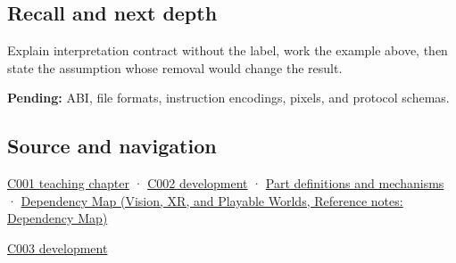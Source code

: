 \subsection{Recall and next depth}\label{appendix-f414bd4ed05c-recall-and-next-depth}

Explain interpretation contract without the label, work the example above, then state the assumption whose removal would change the result.

\textbf{Pending:} ABI, file formats, instruction encodings, pixels, and protocol schemas.

\subsection{Source and navigation}\label{appendix-f414bd4ed05c-source-and-navigation}

\hyperref[01-foundations-i-ch001-from-a-signal-to-an-interpretation]{C001 teaching chapter} · \hyperref[01-foundations-i-ch001-arithmetic-becomes-a-policy]{C002 development} · \hyperref[appendix-fd090d982a15]{Part definitions and mechanisms} · \href{../07-Vision-XR-and-Playable-Worlds/main.pdf\#nameddest=appendix-4ad47bdd269a}{Dependency Map (Vision, XR, and Playable Worlds, Reference notes: Dependency Map)}

\hyperref[01-foundations-i-ch002-where-the-bytes-live]{C003 development}
